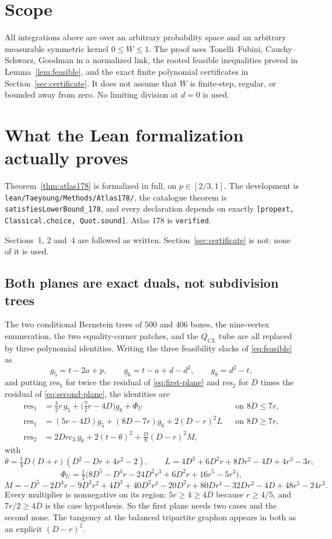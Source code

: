 \documentclass[11pt]{article}
\begin{document}
\section{Scope}

All integrations above are over an arbitrary probability space and an
arbitrary measurable symmetric kernel \(0\leq W\leq1\).  The proof uses
Tonelli--Fubini, Cauchy--Schwarz, Goodman in a normalized link, the rooted
feasible inequalities proved in Lemma~\ref{lem:feasible}, and the exact
finite polynomial certificates in Section~\ref{sec:certificate}.  It does
not assume that \(W\) is finite-step, regular, or bounded away from zero.
No limiting division at \(d=0\) is used.

\section{What the Lean formalization actually proves}

Theorem~\ref{thm:atlas178} is formalized in full, on \(p\in[2/3,1]\).  The
development is \texttt{lean/Taeyoung/Methods/Atlas178/}, the catalogue theorem
is \texttt{satisfiesLowerBound\_178}, and every declaration depends on exactly
\texttt{[propext, Classical.choice, Quot.sound]}.  Atlas \(178\) is
\texttt{verified}.

Sections~1, 2 and~4 are followed as written.
Section~\ref{sec:certificate} is not: none of it is used.

\subsection{Both planes are exact duals, not subdivision trees}

The two conditional Bernstein trees of \(500\) and \(406\) boxes, the
nine-vertex enumeration, the two equality-corner patches, and the \(Q_{CL}\)
tube are all replaced by three polynomial identities.  Writing the three
feasibility slacks of \eqref{eq:feasible} as
\[
 g_5=t-2a+p,\qquad g_6=t-a+d-d^{2},\qquad g_8=d^{2}-t,
\]
and putting \(\mathrm{res}_1\) for twice the residual of
\eqref{eq:first-plane} and \(\mathrm{res}_2\) for \(D\) times the residual of
\eqref{eq:second-plane}, the identities are
\begin{align*}
 \mathrm{res}_1&=\tfrac32 r\,g_5+\bigl(\tfrac72r-4D\bigr)g_8+\Phi_U
   &&\text{on }8D\leq7r,\\
 \mathrm{res}_1&=(5r-4D)g_5+(8D-7r)g_6+2(D-r)^{2}L
   &&\text{on }8D\geq7r,\\
 \mathrm{res}_2&=2Drc_3\,g_6+2(t-\theta)^{2}
   +\tfrac{D}{8}(D-r)^{2}M,
\end{align*}
with
\[
 \theta=\tfrac14 D(D+r)(D^{2}-Dr+4r^{2}-2),\qquad
 L=4D^{3}+6D^{2}r+8Dr^{2}-4D+4r^{3}-3r,
\]
\[
 \Phi_U=\tfrac12\bigl(8D^{5}-D^{4}r-24D^{2}r^{3}+6D^{2}r+16r^{5}-5r^{3}\bigr),
\]
\[
 M=-D^{5}-2D^{4}r-9D^{3}r^{2}+4D^{3}+40D^{2}r^{3}-20D^{2}r
   +80Dr^{4}-32Dr^{2}-4D+48r^{5}-24r^{3}.
\]
Every multiplier is nonnegative on its region: \(5r\geq4\geq4D\) because
\(r\geq4/5\), and \(7r/2\geq4D\) is the case hypothesis.  So the first plane
needs two cases and the second none.  The tangency at the balanced tripartite
graphon appears in both as an explicit \((D-r)^{2}\).
\end{document}

